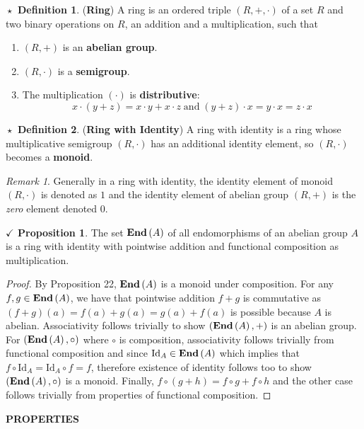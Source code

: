 \documentclass{article}
\theoremstyle{definition}
\newtheorem{definition}{$\boxed{\star}$ Definition}
\theoremstyle{remark}
\newtheorem*{remark}{Remark}
\theoremstyle{definition}
\theoremstyle{definition}
\newtheorem{proposition}{$\checkmark$ Proposition}
\theoremstyle{definition}
\theoremstyle{proof}
\newcommand{\End}[1]{\text{\textbf{End}}\left(#1\right)}
\newcommand{\Id}[1]{\text{Id}_{#1}}
\begin{document}
\hrulefill
\begin{definition}
	(\textbf{Ring}) A ring is an ordered triple $ (R,+,\cdot) $ of a set $ R $ and two binary operations on $ R $, an addition and a multiplication, such that 
	\begin{enumerate}
		\item{$ (R,+) $ is an \textbf{abelian group}.}
		\item{$ (R,\cdot) $ is a \textbf{semigroup}.}
		\item{The multiplication $ (\cdot) $ is \textbf{distributive}:
	\[x\cdot(y+z) = x\cdot y+ x\cdot z\;\text{and}\; (y+z)\cdot x = y\cdot x = z\cdot x\]	
	}
	\end{enumerate}
\end{definition}
\begin{definition}
	(\textbf{Ring with Identity}) A ring with identity is a ring whose multiplicative semigroup $ (R,\cdot) $ has an additional identity element, so $ (R,\cdot) $ becomes a \textbf{monoid}.
\end{definition}
\begin{remark}
	Generally in a ring with identity, the identity element of monoid $ (R,\cdot) $ is denoted as $ 1 $ and the identity element of abelian group $ (R,+) $ is the \textit{zero} element denoted $ 0 $.
\end{remark}
\hrulefill
\begin{proposition}
	The set $ \End{A} $ of all endomorphisms of an abelian group $ A $ is a ring with identity with pointwise addition and functional composition as multiplication.
\end{proposition}
\begin{proof}
	By Proposition 22, $ \End{A} $ is a monoid under composition. For any $ f,g\in \End{A} $, we have that pointwise addition $ f + g $ is commutative as $ (f+g)(a) = f(a) + g(a) = g(a) + f(a) $ is possible because $ A $ is abelian. Associativity follows trivially to show $ (\End{A},+) $ is an abelian group. For $ (\End{A},\circ) $ where $ \circ $ is composition, associativity follows trivially from functional composition and since $ \Id{A} \in \End{A}$ which implies that $ f\circ \Id{A} = \Id{A}\circ f = f $, therefore existence of identity follows too to show $ (\End{A},\circ) $ is a monoid. Finally, $ f\circ (g+h) = f\circ g + f\circ h $ and the other case follows trivially from properties of functional composition.
\end{proof}
\hrulefill
\textbf{PROPERTIES}
\hrulefill
\end{document}
